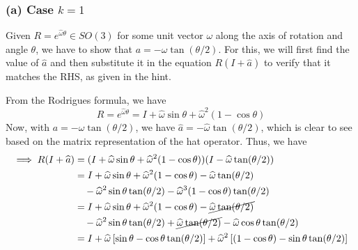 \subsubsection*{(a) Case \( k=1 \)}

Given \( R = e^{\widehat{\omega} \theta} \in SO(3) \) for some unit vector \( \omega \) along the axis of rotation and angle \( \theta \), we have to show that \( a = -\omega \tan(\theta / 2) \).
For this, we will first find the value of \( \widehat{a} \) and then substitute it in the equation \( R(I + \widehat{a}) \) to verify that it matches the RHS, as given in the hint.

From the Rodrigues formula, we have
\begin{equation*}
    R = e^{\widehat{\omega} \theta} = I + \widehat{\omega} \sin \theta + \widehat{\omega}^{2} (1 - \cos \theta)
\end{equation*}
Now, with \( a = -\omega \tan(\theta / 2) \), we have \( \widehat{a} = -\widehat{\omega} \tan(\theta / 2) \), which is clear to see based on the matrix representation of the hat operator.
Thus, we have
\begin{align*}
    \implies
    R(I + \widehat{a})
     & =
    (I + \widehat{\omega} \sin \theta + \widehat{\omega}^{2} (1 - \cos \theta))(I - \widehat{\omega} \tan(\theta / 2))
    \\ & =
    I + \widehat{\omega} \sin \theta + \widehat{\omega}^{2} (1 - \cos \theta) - \widehat{\omega} \tan(\theta / 2)
    \\ & \quad
    - \widehat{\omega}^{2} \sin \theta \tan(\theta / 2) - \widehat{\omega}^{3} (1 - \cos \theta) \tan(\theta / 2)
    \\ & =
    I + \widehat{\omega} \sin \theta + \widehat{\omega}^{2} (1 - \cos \theta) - \cancel{\widehat{\omega} \tan(\theta / 2)}
    \\ & \quad
    - \widehat{\omega}^{2} \sin \theta \tan(\theta / 2) + \cancel{\widehat{\omega} \tan(\theta / 2)} - \widehat{\omega} \cos \theta \tan(\theta / 2)
    \\ & =
    I + \widehat{\omega} \left[ \sin \theta - \cos \theta \tan(\theta / 2) \right] + \widehat{\omega}^{2} \left[(1 - \cos \theta) - \sin \theta \tan(\theta / 2) \right]
\end{align*}

